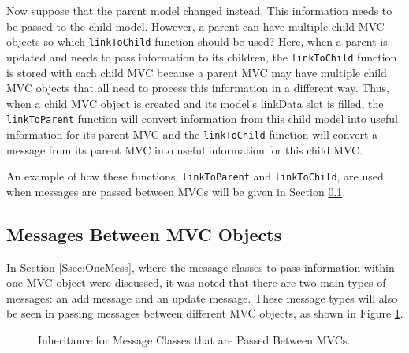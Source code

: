 \documentclass{article}[11pt]
\newcommand{\Rfunction}[1]{{\texttt{#1}}}
\begin{document}
Now suppose that the parent model changed instead.  This information
needs to be passed to the child model.  However, a parent can have multiple
child MVC objects so which \Rfunction{linkToChild} function should be used?
Here, when a parent is updated and needs to pass information to its children,
the \Rfunction{linkToChild} function is stored with each child MVC because a
parent MVC may have multiple child MVC objects that all need to process this
information in a different way.  Thus, when a child MVC object is created and
its model's linkData slot is filled, the \Rfunction{linkToParent} function
will convert information from this child model into useful information for its
parent MVC and the \Rfunction{linkToChild} function will convert a message
from its parent MVC into useful information for this child MVC.

An example of how these functions, \Rfunction{linkToParent} and
\Rfunction{linkToChild}, are used when messages are passed between MVCs will
be given in Section \ref{Ssec:MultMess}.

\subsection{Messages Between MVC Objects}\label{Ssec:MultMess}

In Section \ref{Ssec:OneMess}, where the message classes to pass information
within one MVC object were discussed, it was noted that there are two main
types of messages: an add message and an update message.  These message types
will also be seen in passing messages between different MVC objects, as shown
in Figure \ref{Fig:BetwMess}.  

\begin{figure}[ht]
  \begin{center}
    \caption{ Inheritance for Message Classes that are Passed Between MVCs. }
    \label{Fig:BetwMess}
  \end{center}
\end{figure}
\end{document}
